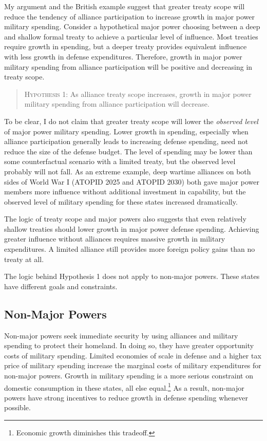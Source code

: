 \documentclass[12pt]{article}
\begin{document}
My argument and the British example suggest that greater treaty scope will reduce the tendency of alliance participation to increase growth in major power military spending.
Consider a hypothetical major power choosing between a deep and shallow formal treaty to achieve a particular level of influence.  
Most treaties require growth in spending, but a deeper treaty provides equivalent influence with less growth in defense expenditures. 
Therefore, growth in major power military spending from alliance participation will be positive and decreasing in treaty scope. 


\begin{quote}
\textsc{Hypothesis 1}: As alliance treaty scope increases, growth in major power military spending from alliance participation will decrease. 
\end{quote}


To be clear, I do not claim that greater treaty scope will lower the \textit{observed level} of major power military spending. 
Lower growth in spending, especially when alliance participation generally leads to increasing defense spending, need not reduce the size of the defense budget. 
The level of spending may be lower than some counterfactual scenario with a limited treaty, but the observed level probably will not fall. 
As an extreme example, deep wartime alliances on both sides of World War I (ATOPID 2025 and ATOPID 2030) both gave major power members more influence without additional investment in capability, but the observed level of military spending for these states increased dramatically. 


The logic of treaty scope and major powers also suggests that even relatively shallow treaties should lower growth in major power defense spending. 
Achieving greater influence without alliances requires massive growth in military expenditures. 
A limited alliance still provides more foreign policy gains than no treaty at all. 


The logic behind Hypothesis 1 does not apply to non-major powers. 
These states have different goals and constraints. 


\subsection{Non-Major Powers} 


Non-major powers seek immediate security by using alliances and military spending to protect their homeland.  
In doing so, they have greater opportunity costs of military spending. 
Limited economies of scale in defense and a higher tax price of military spending increase the marginal costs of military expenditures for non-major powers. 
Growth in military spending is a more serious constraint on domestic consumption in these states, all else equal.\footnote{Economic growth diminishes this tradeoff.} 
As a result, non-major powers have strong incentives to reduce growth in defense spending whenever possible.
\end{document}
